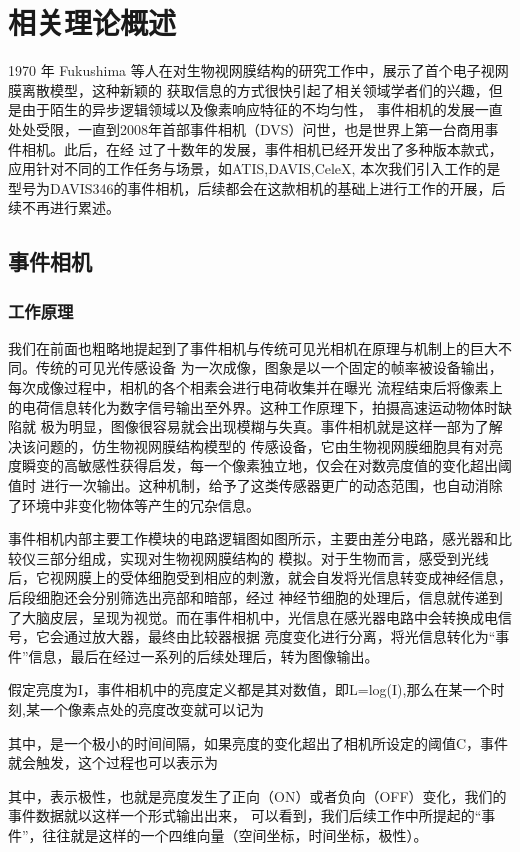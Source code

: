 \chapter{相关理论概述}
1970 年 Fukushima 等人在对生物视网膜结构的研究工作中，展示了首个电子视网膜离散模型，这种新颖的
获取信息的方式很快引起了相关领域学者们的兴趣，但是由于陌生的异步逻辑领域以及像素响应特征的不均匀性，
事件相机的发展一直处处受限，一直到2008年首部事件相机（DVS）问世，也是世界上第一台商用事件相机。此后，在经
过了十数年的发展，事件相机已经开发出了多种版本款式，应用针对不同的工作任务与场景，如ATIS,DAVIS,CeleX,
本次我们引入工作的是型号为DAVIS346的事件相机，后续都会在这款相机的基础上进行工作的开展，后续不再进行累述。

\section{事件相机}
\subsection{工作原理}
我们在前面也粗略地提起到了事件相机与传统可见光相机在原理与机制上的巨大不同。传统的可见光传感设备
为一次成像，图象是以一个固定的帧率被设备输出，每次成像过程中，相机的各个相素会进行电荷收集并在曝光
流程结束后将像素上的电荷信息转化为数字信号输出至外界。这种工作原理下，拍摄高速运动物体时缺陷就
极为明显，图像很容易就会出现模糊与失真。事件相机就是这样一部为了解决该问题的，仿生物视网膜结构模型的
传感设备，它由生物视网膜细胞具有对亮度瞬变的高敏感性获得启发，每一个像素独立地，仅会在对数亮度值的变化超出阈值时
进行一次输出。这种机制，给予了这类传感器更广的动态范围，也自动消除了环境中非变化物体等产生的冗杂信息。

事件相机内部主要工作模块的电路逻辑图如图所示，主要由差分电路，感光器和比较仪三部分组成，实现对生物视网膜结构的
模拟。对于生物而言，感受到光线后，它视网膜上的受体细胞受到相应的刺激，就会自发将光信息转变成神经信息，后段细胞还会分别筛选出亮部和暗部，经过
神经节细胞的处理后，信息就传递到了大脑皮层，呈现为视觉。而在事件相机中，光信息在感光器电路中会转换成电信号，它会通过放大器，最终由比较器根据
亮度变化进行分离，将光信息转化为“事件”信息，最后在经过一系列的后续处理后，转为图像输出。

假定亮度为I，事件相机中的亮度定义都是其对数值，即L=log(I),那么在某一个时刻,某一个像素点处的亮度改变就可以记为

其中，是一个极小的时间间隔，如果亮度的变化超出了相机所设定的阈值C，事件就会触发，这个过程也可以表示为

其中，表示极性，也就是亮度发生了正向（ON）或者负向（OFF）变化，我们的事件数据就以这样一个形式输出出来，
可以看到，我们后续工作中所提起的“事件”，往往就是这样的一个四维向量（空间坐标，时间坐标，极性）。

